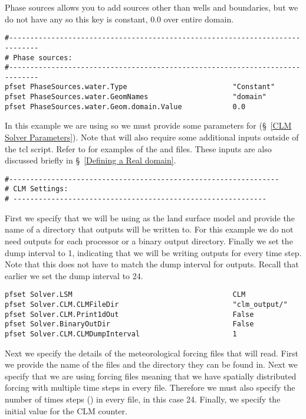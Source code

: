 Phase sources allows you to add sources other than wells and boundaries, but 
we do not have any so this key is constant, 0.0 over entire domain.

\begin{verbatim}
#-----------------------------------------------------------------------------
# Phase sources:
#-----------------------------------------------------------------------------
pfset PhaseSources.water.Type                         "Constant"
pfset PhaseSources.water.GeomNames                    "domain"
pfset PhaseSources.water.Geom.domain.Value            0.0
\end{verbatim}

In this example we are using \parflow{}  so we must provide some parameters for  (\S~\ref{CLM Solver Parameters}).
Note that  will also require some additional inputs outside of the tcl script. Refer to 
 for examples of the   and  files. These inputs
are also discussed briefly in \S~\ref{Defining a Real domain}.

\begin{verbatim}
#----------------------------------------------------------------
# CLM Settings:
# ------------------------------------------------------------
\end{verbatim}

First we specify that we will be using  as the land surface model and provide the name of a directory
that outputs will be written to. For this example we do not need outputs for each processor or a binary output directory. 
Finally we set the dump interval to 1, indicating that we will be writing outputs for every time step. Note that
this does not have to match the dump interval for \parflow{} outputs. Recall that earlier we set the \parflow{} dump
interval to 24. 

\begin{verbatim}
pfset Solver.LSM                                      CLM
pfset Solver.CLM.CLMFileDir                           "clm_output/"
pfset Solver.CLM.Print1dOut                           False
pfset Solver.BinaryOutDir                             False
pfset Solver.CLM.CLMDumpInterval                      1
\end{verbatim}

Next we specify the details of the meteorological forcing files that  will read. First we provide the 
name of the files and the directory they can be found in. Next we specify that we are using
 forcing files meaning that we have spatially distributed forcing with multiple time steps in every 
file. Therefore we must also specify the number of times steps () in every file, in this case 24.  
Finally, we specify the initial value for the CLM counter. 

